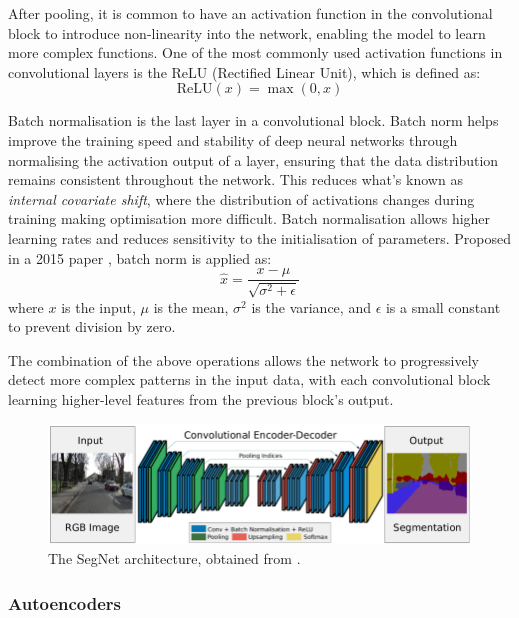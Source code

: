 After pooling, it is common to have an activation function in the convolutional block to introduce non-linearity into the network, enabling the model to learn more complex functions. One of the most commonly used activation functions in convolutional layers is the ReLU (Rectified Linear Unit), which is defined as:
\begin{equation}
    \text{ReLU}(x) = \max(0, x)
\end{equation}

Batch normalisation is the last layer in a convolutional block. Batch norm helps improve the training speed and stability of deep neural networks through normalising the activation output of a layer, ensuring that the data distribution remains consistent throughout the network. This reduces what's known as \textit{internal covariate shift}, where the distribution of activations changes during training making optimisation more difficult. Batch normalisation allows higher learning rates and reduces sensitivity to the initialisation of parameters. Proposed in a 2015 paper \cite{ioffe_batch_2015}, batch norm is applied as:
\begin{equation}
    \hat{x} = \frac{x - \mu}{\sqrt{\sigma^2 + \epsilon}}
\end{equation}
where $x$ is the input, $\mu$ is the mean, $\sigma^2$ is the variance, and $\epsilon$ is a small constant to prevent division by zero. 

The combination of the above operations allows the network to progressively detect more complex patterns in the input data, with each convolutional block learning higher-level features from the previous block's output. 

\begin{figure}[t]
    \centering
    \includegraphics[width=\textwidth]{img/ch1/segnet.png}
    \caption{The SegNet architecture, obtained from \cite{badrinarayanan_segnet_2015}.}
    \label{fig:segnet}
\end{figure}

\subsubsection{Autoencoders}

